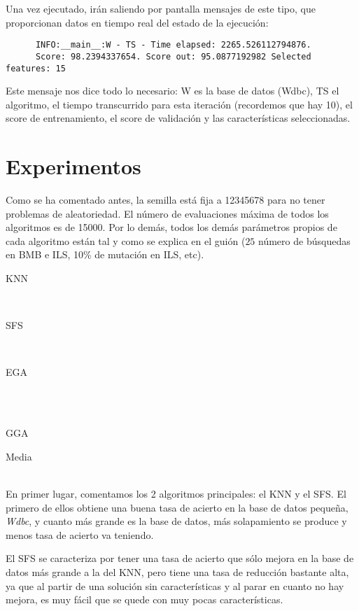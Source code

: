 \documentclass[a4paper, 11pt]{article}
\begin{document}
    Una vez ejecutado, irán saliendo por pantalla mensajes de este tipo, que proporcionan datos en tiempo real del estado de la ejecución:

    \begin{verbatim}
      INFO:__main__:W - TS - Time elapsed: 2265.526112794876.
      Score: 98.2394337654. Score out: 95.0877192982 Selected features: 15
    \end{verbatim}

    Este mensaje nos dice todo lo necesario: W es la base de datos (Wdbc), TS el algoritmo, el tiempo transcurrido para esta iteración (recordemos que hay 10), el score de entrenamiento, el score de validación y las características seleccionadas.
  \section{Experimentos}
    Como se ha comentado antes, la semilla está fija a 12345678 para no tener problemas de aleatoriedad. El número de evaluaciones máxima de todos los algoritmos es de 15000. Por lo demás, todos los demás parámetros propios de cada algoritmo están tal y como se explica en el guión ($25$ número de búsquedas en BMB e ILS, 10\% de mutación en ILS, etc). \\

    \newpage

    \centerline{KNN}
    \\
    \centerline{SFS}
    
    \\ \centerline{EGA}
    \\
    \\ \centerline{GGA}
    
    \newpage
    \centerline{Media}
    \\

    En primer lugar, comentamos los 2 algoritmos principales: el KNN y el SFS. El primero de ellos obtiene una buena tasa de acierto en la base de datos pequeña, \emph{Wdbc}, y cuanto más grande es la base de datos, más solapamiento se produce y menos tasa de acierto va teniendo.

    El SFS se caracteriza por tener una tasa de acierto que sólo mejora en la base de datos más grande a la del KNN, pero tiene una tasa de reducción bastante alta, ya que al partir de una solución sin características y al parar en cuanto no hay mejora, es muy fácil que se quede con muy pocas características.
\end{document}
